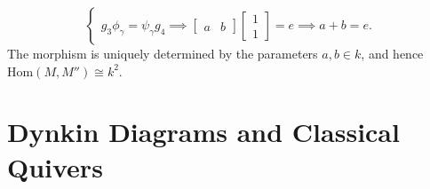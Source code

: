\documentclass[11pt, a4paper]{report}
\begin{document}
\begin{example}
\[\begin{cases}
            g_3 \phi_\gamma = \psi_\gamma g_4 \implies \begin{bmatrix} a & b \end{bmatrix} \begin{bmatrix} 1 \\ 1 \end{bmatrix} = e \implies a + b = e.
        \end{cases}
    \]
    The morphism is uniquely determined by the parameters $a, b \in k$, and hence $\mathrm{Hom}(M, M'') \cong k^2$.
\end{example}

\section{Dynkin Diagrams and Classical Quivers}
\end{document}
